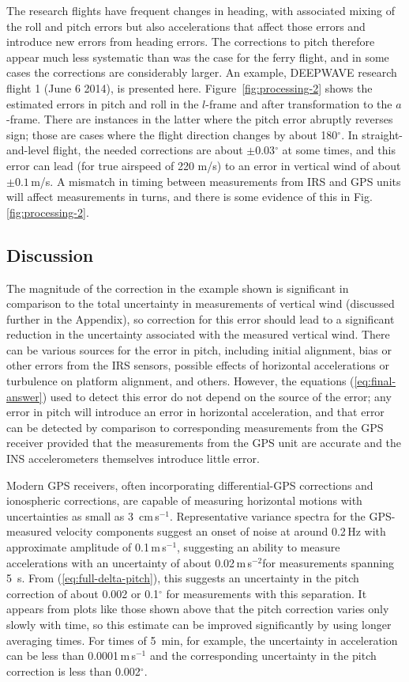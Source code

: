 \documentclass[english,british,amt,bookmarks=false,unicode=true]{copernicus}\usepackage[]{graphicx}\usepackage[]{color}
\begin{document}
The research flights have frequent changes in heading, with associated
mixing of the roll and pitch errors but also accelerations that affect
those errors and introduce new errors from heading errors. The corrections
to pitch therefore appear much less systematic than was the case for
the ferry flight, and in some cases the corrections are considerably
larger. An example, DEEPWAVE research flight 1 (June 6 2014), is presented
here. Figure~\ref{fig:processing-2} shows the estimated errors in
pitch and roll in the $l$-frame and after transformation to the $a$-frame.
There are instances in the latter where the pitch error abruptly reverses
sign; those are cases where the flight direction changes by about
180$^{\circ}$. In straight-and-level flight, the needed corrections
are about $\pm$0.03$^{\circ}$ at some times, and this error can
lead (for true airspeed of 220 m/s) to an error in vertical wind of
about $\pm0.1$\,m/s. A mismatch in timing between measurements from
IRS and GPS units will affect measurements in turns, and there is
some evidence of this in Fig.\-\ref{fig:processing-2}. 


\subsection{Discussion}

The magnitude of the correction in the example shown is significant
in comparison to the total uncertainty in measurements of vertical
wind (discussed further in the Appendix), so correction for this error
should lead to a significant reduction in the uncertainty associated
with the measured vertical wind. There can be various sources for
the error in pitch, including initial alignment, bias or other errors
from the IRS sensors, possible effects of horizontal accelerations
or turbulence on platform alignment, and others. However, the equations
(\ref{eq:final-answer}) used to detect this error do not depend on
the source of the error; any error in pitch will introduce an error
in horizontal acceleration, and that error can be detected by comparison
to corresponding measurements from the GPS receiver provided that
the measurements from the GPS unit are accurate and the INS accelerometers
themselves introduce little error. 

Modern GPS receivers, often incorporating differential-GPS corrections
and ionospheric corrections, are capable of measuring horizontal motions
with uncertainties as small as 3~cm\,s$^{-1}$. Representative variance
spectra for the GPS-measured velocity components suggest an onset
of noise at around 0.2\,Hz with approximate amplitude of 0.1\,m\,s$^{-1}$,
suggesting an ability to measure accelerations with an uncertainty
of about 0.02\,m\,s$^{-2}$for measurements spanning 5~s. From
(\ref{eq:full-delta-pitch}), this suggests an uncertainty in the
pitch correction of about 0.002 or 0.1$^{\circ}$ for measurements
with this separation. It appears from plots like those shown above
that the pitch correction varies only slowly with time, so this estimate
can be improved significantly by using longer averaging times. For
times of 5~min, for example, the uncertainty in acceleration can
be less than 0.0001\,m\,s$^{-1}$ and the corresponding uncertainty
in the pitch correction is less than 0.002$^{\circ}$. 
\end{document}
